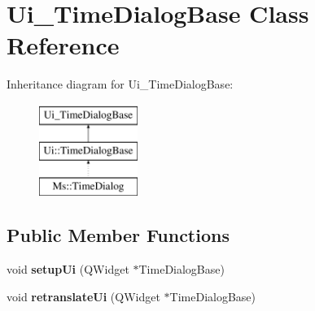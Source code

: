 \hypertarget{class_ui___time_dialog_base}{}\section{Ui\+\_\+\+Time\+Dialog\+Base Class Reference}
\label{class_ui___time_dialog_base}
Inheritance diagram for Ui\+\_\+\+Time\+Dialog\+Base\+:\begin{figure}[H]
\begin{center}
\leavevmode
\includegraphics[height=3.000000cm]{class_ui___time_dialog_base}
\end{center}
\end{figure}
\subsection*{Public Member Functions}
\begin{DoxyCompactItemize}
\item 
\mbox{\label{class_ui___time_dialog_base_afebe24141a09b42fcbc7f75471c8f442}} 
void {\bfseries setup\+Ui} (Q\+Widget $\ast$Time\+Dialog\+Base)
\item 
\mbox{\label{class_ui___time_dialog_base_aae192d6377e48639a744b4fe6aefe585}} 
void {\bfseries retranslate\+Ui} (Q\+Widget $\ast$Time\+Dialog\+Base)
\end{DoxyCompactItemize}
